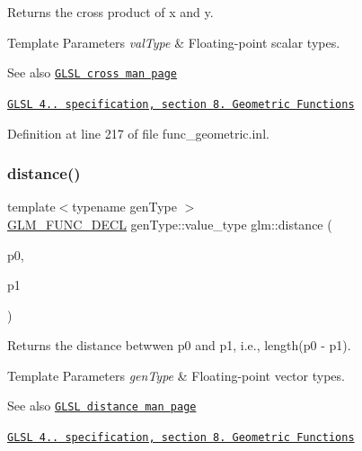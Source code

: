 Returns the cross product of x and y.


\begin{DoxyTemplParams}{Template Parameters}
{\em val\+Type} & Floating-\/point scalar types.\\
\hline
\end{DoxyTemplParams}
\begin{DoxySeeAlso}{See also}
\href{http://www.opengl.org/sdk/docs/manglsl/xhtml/cross.xml}{\tt G\+L\+SL cross man page} 

\href{http://www.opengl.org/registry/doc/GLSLangSpec.4.20.8.pdf}{\tt G\+L\+SL 4.. specification, section 8. Geometric Functions} 
\end{DoxySeeAlso}


Definition at line 217 of file func\+\_\+geometric.\+inl.

\mbox{\label{group__core__func__geometric_ga00716eae37e8ae2a76ca7799f9c75682}} 
\subsubsection{\texorpdfstring{distance()}{distance()}}
{\footnotesize\ttfamily template$<$typename gen\+Type $>$ \\
\hyperlink{setup_8hpp_ab2d052de21a70539923e9bcbf6e83a51}{G\+L\+M\+\_\+\+F\+U\+N\+C\+\_\+\+D\+E\+CL} gen\+Type\+::value\+\_\+type glm\+::distance (\begin{DoxyParamCaption}\item[{gen\+Type const \&}]{p0,  }\item[{gen\+Type const \&}]{p1 }\end{DoxyParamCaption})}

Returns the distance betwwen p0 and p1, i.\+e., length(p0 -\/ p1).


\begin{DoxyTemplParams}{Template Parameters}
{\em gen\+Type} & Floating-\/point vector types.\\
\hline
\end{DoxyTemplParams}
\begin{DoxySeeAlso}{See also}
\href{http://www.opengl.org/sdk/docs/manglsl/xhtml/distance.xml}{\tt G\+L\+SL distance man page} 

\href{http://www.opengl.org/registry/doc/GLSLangSpec.4.20.8.pdf}{\tt G\+L\+SL 4.. specification, section 8. Geometric Functions} 
\end{DoxySeeAlso}


